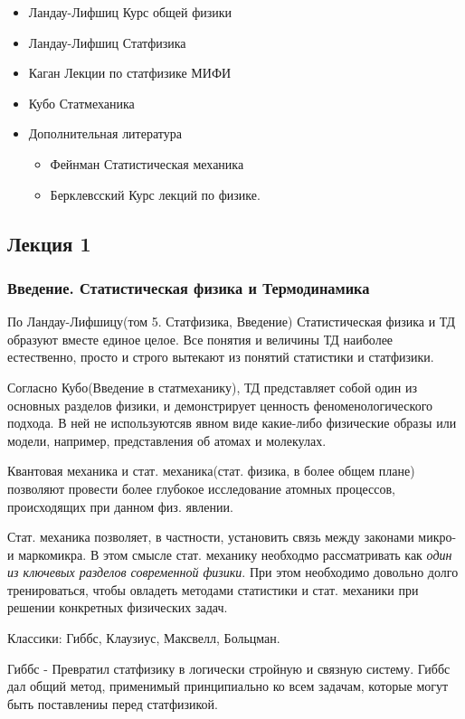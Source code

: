 \documentclass{article}
\begin{document}
\begin{itemize}
\item Ландау-Лифшиц Курс общей физики
\item Ландау-Лифшиц Статфизика 
\item Каган Лекции по статфизике МИФИ
\item Кубо Статмеханика

\item Дополнительная литература
       \begin{itemize}
         \item Фейнман Статистическая механика
         \item Берклевсский Курс лекций по физике. 
       \end{itemize}

\end{itemize}

\subsection{Лекция 1}
\subsubsection{Введение. Статистическая физика и Термодинамика}
По Ландау-Лифшицу(том 5. Статфизика, Введение) Статистическая физика и ТД образуют вместе единое целое. Все понятия и величины ТД наиболее естественно, просто и строго вытекают из понятий статистики и статфизики.

Согласно Кубо(Введение в статмеханику), ТД представляет собой один из основных разделов физики, и демонстрирует ценность феноменологического подхода. В ней не используютсяв явном виде какие-либо физические образы или модели, например, представления об атомах и молекулах. 

Квантовая механика и стат. механика(стат. физика, в более общем плане) позволяют провести более глубокое исследование атомных процессов, происходящих при данном физ. явлении.

Стат. механика позволяет, в частности, установить связь между законами микро- и маркомикра. В этом смысле стат. механику необходмо рассматривать как \emph{один из ключевых разделов современной физики}. При этом необходимо довольно долго тренироваться, чтобы овладеть методами статистики и стат. механики при решении конкретных  физических задач. 

Классики: Гиббс, Клаузиус, Максвелл, Больцман.

Гиббс - Превратил статфизику в логически стройную и связную систему. Гиббс дал общий метод, применимый принципиально ко всем задачам, которые могут быть поставлениы перед статфизикой.
\end{document}
